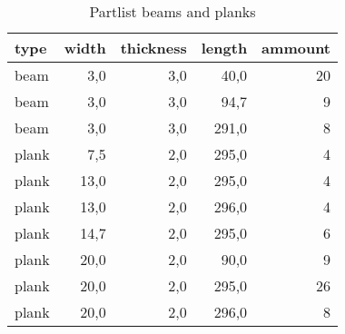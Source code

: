 \begin{table}[h!]
\centering
\caption{Partlist beams and planks}
\begin{tabular}{lrrrr}
\toprule
 type &  width &  thickness &  length &  ammount \\
\midrule
 beam &    3,0 &        3,0 &    40,0 &       20 \\
 beam &    3,0 &        3,0 &    94,7 &        9 \\
 beam &    3,0 &        3,0 &   291,0 &        8 \\
plank &    7,5 &        2,0 &   295,0 &        4 \\
plank &   13,0 &        2,0 &   295,0 &        4 \\
plank &   13,0 &        2,0 &   296,0 &        4 \\
plank &   14,7 &        2,0 &   295,0 &        6 \\
plank &   20,0 &        2,0 &    90,0 &        9 \\
plank &   20,0 &        2,0 &   295,0 &       26 \\
plank &   20,0 &        2,0 &   296,0 &        8 \\
\bottomrule
\end{tabular}
\end{table}
